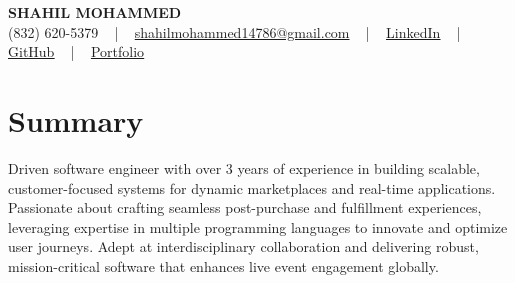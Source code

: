 \documentclass[letterpaper,10pt]{article}
\begin{document}
\begin{center}
    {\fontsize{14pt}{12pt}\selectfont \textbf{\MakeUppercase{Shahil Mohammed}}}\\ \vspace{2pt}
    \fontsize{10pt}{12pt}\selectfont (832) 620-5379 ~ | ~ \href{mailto:shahilmohammed14786@gmail.com}{shahilmohammed14786@gmail.com} ~ | ~  
    \href{https://www.linkedin.com/in/shahil-mohammed-9652931a1/}{\color{blue}\underline{LinkedIn}}  ~ | ~ 
    \href{https://github.com/freakbeast14}{\color{blue}\underline{GitHub}} ~ | ~ 
    \href{https://shahil-mohammed.netlify.app/}{\color{blue}\underline{Portfolio}}
    \vspace{-8pt}
\end{center}

\section{Summary}
\vspace{-2pt}\fontsize{8pt}{9pt}\selectfont
Driven software engineer with over 3 years of experience in building scalable, customer-focused systems for dynamic marketplaces and real-time applications. Passionate about crafting seamless post-purchase and fulfillment experiences, leveraging expertise in multiple programming languages to innovate and optimize user journeys. Adept at interdisciplinary collaboration and delivering robust, mission-critical software that enhances live event engagement globally.
 \vspace{-5pt}
 
\vspace{-2pt}
\end{document}
